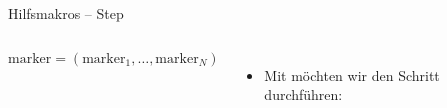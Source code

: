 \begin{frame}[c,fragile]{Hilfsmakros -- Step}
    \footnotesize\begin{columns}[c,onlytextwidth]%
\begin{algorithm}[H]
    \PreCode
    \StartCode
    \(\mathrm{marker} = (\mathrm{marker}_1, \ldots, \mathrm{marker}_N)\)\;
\end{algorithm}
\begin{itemize}[<+(1)->]
    \item Mit  möchten wir den Schritt  durchführen:\pause
\begin{plainxlatex}[morekeywords={[5]{\\i}}]
\newcommand{\SieveStep}[1]{
  \calc \start = #1 * #1;
  \calc \nx = \start + #1;
  \foreach \i in {\start,\nx,...,\N}{
    \csgdef{marker@!**!\i}{#1}
  }
}
\end{plainxlatex}
\end{itemize}
\end{columns}
\end{frame}

